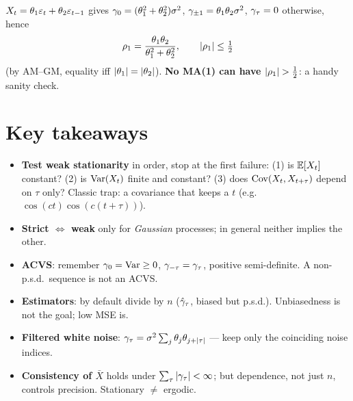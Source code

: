 \documentclass[11pt]{article}
\begin{document}
\begin{exmpl}
$X_t=\theta_1\varepsilon_t+\theta_2\varepsilon_{t-1}$ gives $\gamma_0=(\theta_1^2+\theta_2^2)\sigma^2$, $\gamma_{\pm1}=\theta_1\theta_2\sigma^2$, $\gamma_\tau=0$ otherwise, hence
\[
\rho_1=\frac{\theta_1\theta_2}{\theta_1^2+\theta_2^2},\qquad \left\lvert \rho_1 \right\rvert\le\tfrac12
\]
(by AM--GM, equality iff $\left\lvert \theta_1 \right\rvert=\left\lvert \theta_2 \right\rvert$). \textbf{No MA(1) can have $\left\lvert \rho_1 \right\rvert>\tfrac12$}: a handy sanity check.
\end{exmpl}

\section*{Key takeaways}

\begin{retenir}
\begin{itemize}
  \item \textbf{Test weak stationarity} in order, stop at the first failure: (1) is $\mathbb{E}[X_t]$ constant? (2) is $\operatorname{Var}(X_t)$ finite and constant? (3) does $\operatorname{Cov}(X_t,X_{t+\tau})$ depend on $\tau$ only? Classic trap: a covariance that keeps a $t$ (e.g.\ $\cos(ct)\cos(c(t+\tau))$).
  \item \textbf{Strict $\Leftrightarrow$ weak} only for \emph{Gaussian} processes; in general neither implies the other.
  \item \textbf{ACVS}: remember $\gamma_0=\operatorname{Var}\ge0$, $\gamma_{-\tau}=\gamma_\tau$, positive semi-definite. A non-p.s.d.\ sequence is not an ACVS.
  \item \textbf{Estimators}: by default divide by $n$ ($\hat{\gamma}_\tau$, biased but p.s.d.). Unbiasedness is not the goal; low MSE is.
  \item \textbf{Filtered white noise}: $\gamma_\tau=\sigma^2\sum_j\theta_j\theta_{j+\left\lvert \tau \right\rvert}$ --- keep only the coinciding noise indices.
  \item \textbf{Consistency of $\bar X$} holds under $\sum_\tau\left\lvert \gamma_\tau \right\rvert<\infty$; but dependence, not just $n$, controls precision. Stationary $\ne$ ergodic.
\end{itemize}
\end{retenir}
\end{document}
